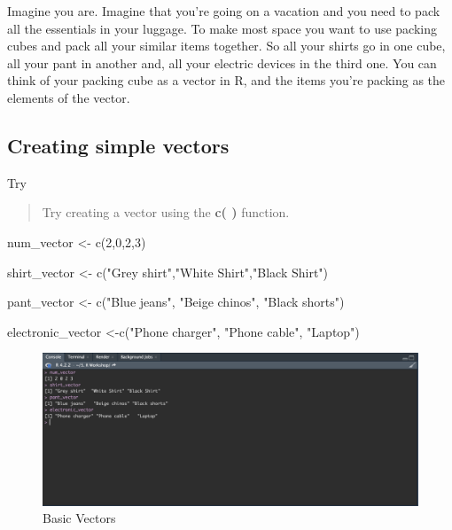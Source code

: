 \documentclass[
]{book}
\newenvironment{Shaded}{\begin{snugshade}}{\end{snugshade}}
\newcommand{\DecValTok}[1]{\textcolor[rgb]{0.00,0.00,0.81}{#1}}
\newcommand{\FunctionTok}[1]{\textcolor[rgb]{0.00,0.00,0.00}{#1}}
\newcommand{\NormalTok}[1]{#1}
\newcommand{\OtherTok}[1]{\textcolor[rgb]{0.56,0.35,0.01}{#1}}
\newcommand{\StringTok}[1]{\textcolor[rgb]{0.31,0.60,0.02}{#1}}
\begin{document}
Imagine you are. Imagine that you're going on a vacation and you need to pack all the essentials in your luggage. To make most space you want to use packing cubes and pack all your similar items together. So all your shirts go in one cube, all your pant in another and, all your electric devices in the third one. You can think of your packing cube as a vector in R, and the items you're packing as the elements of the vector.

\hypertarget{creating-simple-vectors}{%
\subsection{Creating simple vectors}\label{creating-simple-vectors}}

Try

\begin{quote}
Try creating a vector using the \textbf{c( )} function.
\end{quote}

\begin{Shaded}
\begin{Highlighting}[]
\NormalTok{num\_vector }\OtherTok{\textless{}{-}} \FunctionTok{c}\NormalTok{(}\DecValTok{2}\NormalTok{,}\DecValTok{0}\NormalTok{,}\DecValTok{2}\NormalTok{,}\DecValTok{3}\NormalTok{)}

\NormalTok{shirt\_vector }\OtherTok{\textless{}{-}} \FunctionTok{c}\NormalTok{(}\StringTok{"Grey shirt"}\NormalTok{,}\StringTok{"White Shirt"}\NormalTok{,}\StringTok{"Black Shirt"}\NormalTok{)}

\NormalTok{pant\_vector }\OtherTok{\textless{}{-}} \FunctionTok{c}\NormalTok{(}\StringTok{"Blue jeans"}\NormalTok{, }\StringTok{"Beige chinos"}\NormalTok{, }\StringTok{"Black shorts"}\NormalTok{)}

\NormalTok{electronic\_vector }\OtherTok{\textless{}{-}}\FunctionTok{c}\NormalTok{(}\StringTok{"Phone charger"}\NormalTok{, }\StringTok{"Phone cable"}\NormalTok{, }\StringTok{"Laptop"}\NormalTok{)}
\end{Highlighting}
\end{Shaded}

\begin{figure}
\includegraphics[width=29.25in]{images/3.5vectorconsole} \caption{Basic Vectors}\label{fig:unnamed-chunk-16}
\end{figure}
\end{document}
